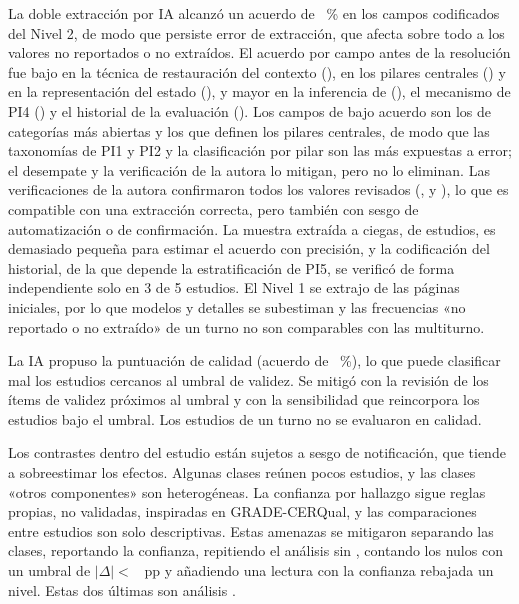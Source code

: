 La doble extracción por IA alcanzó un acuerdo de \acuerdoNivelDos~\% en los campos codificados del Nivel 2, de modo que persiste error de extracción, que afecta sobre todo a los valores no reportados o no extraídos. El acuerdo por campo antes de la resolución fue bajo en la técnica de restauración del contexto (\acuerdoCampoTecnicaContexto{}), en los pilares centrales (\acuerdoCampoPilaresCentrales{}) y en la representación del estado (\acuerdoCampoRepresentacion{}), y mayor en la inferencia de  (\acuerdoCampoInferenciaJoins{}), el mecanismo de PI4 (\acuerdoCampoMecanismo{}) y el historial de la evaluación (\acuerdoCampoHistorial{}). Los campos de bajo acuerdo son los de categorías más abiertas y los que definen los pilares centrales, de modo que las taxonomías de PI1 y PI2 y la clasificación por pilar son las más expuestas a error; el desempate y la verificación de la autora lo mitigan, pero no lo eliminan. Las verificaciones de la autora confirmaron todos los valores revisados (\verifC{}, \verifD{} y \verifB{}), lo que es compatible con una extracción correcta, pero también con sesgo de automatización o de confirmación. La muestra extraída a ciegas, de \nMuestraCiega{} estudios, es demasiado pequeña para estimar el acuerdo con precisión, y la codificación del historial, de la que depende la estratificación de PI5, se verificó de forma independiente solo en 3 de 5 estudios. El Nivel 1 se extrajo de las páginas iniciales, por lo que modelos y detalles se subestiman y las frecuencias «no reportado o no extraído» de un turno no son comparables con las multiturno.

La IA propuso la puntuación de calidad (acuerdo de \acuerdoCalidad~\%), lo que puede clasificar mal los estudios cercanos al umbral de validez. Se mitigó con la revisión de los ítems de validez próximos al umbral y con la sensibilidad que reincorpora los estudios bajo el umbral. Los estudios de un turno no se evaluaron en calidad.

Los contrastes dentro del estudio están sujetos a sesgo de notificación, que tiende a sobreestimar los efectos. Algunas clases reúnen pocos estudios, y las clases «otros componentes» son heterogéneas. La confianza por hallazgo sigue reglas propias, no validadas, inspiradas en GRADE-CERQual, y las comparaciones entre estudios son solo descriptivas. Estas amenazas se mitigaron separando las clases, reportando la confianza, repitiendo el análisis sin , contando los nulos con un umbral de $|\Delta| <$ \umbralNulo{}~pp y añadiendo una lectura con la confianza rebajada un nivel. Estas dos últimas son análisis .

